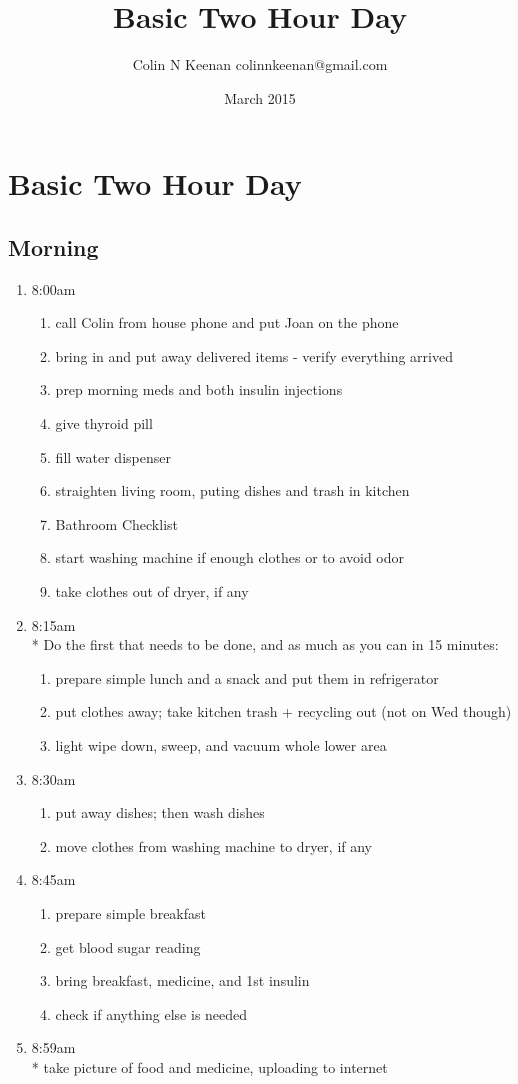 \documentclass[12pt,letterpaper]{article}
\newcommand{\mytitle}{Basic Two Hour Day}
\begin{document}
\title{\mytitle{}}
\author{Colin N Keenan colinnkeenan@gmail.com}
\date{March 2015}
\section*{\mytitle{}}
\begin{multicols}{2} 
\subsection*{Morning}
\begin{enumerate}
	\item 8:00am
		\begin{enumerate}
			\item call Colin from house phone and put Joan on the phone
			\item bring in and put away delivered items - verify everything arrived
			\item prep morning meds and both insulin injections
			\item give thyroid pill
			\item fill water dispenser
			\item straighten living room, puting dishes and trash in kitchen
			\item Bathroom Checklist
			\item start washing machine if enough clothes or to avoid odor
			\item take clothes out of dryer, if any
		\end{enumerate}
	\item 8:15am \\*
		Do the first that needs to be done, and as much as you can in 15 minutes:
		\begin{enumerate}
			\item prepare simple lunch and a snack and put them in refrigerator
			\item put clothes away; take kitchen trash + recycling out (not on Wed though)
			\item light wipe down, sweep, and vacuum whole lower area
		\end{enumerate}
	\item 8:30am
		\begin{enumerate}
			\item put away dishes; then wash dishes
			\item move clothes from washing machine to dryer, if any
		\end{enumerate}
	\item 8:45am
		\begin{enumerate}
			\item prepare simple breakfast
			\item get blood sugar reading
			\item bring breakfast, medicine, and 1st insulin
			\item check if anything else is needed
		\end{enumerate}
	\item 8:59am \\*
		take picture of food and medicine, uploading to internet
\end{enumerate}
\vfill
\columnbreak


\end{multicols}
\end{document}
